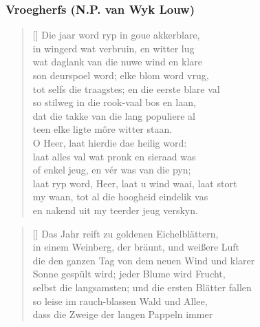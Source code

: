 \documentclass[8pt]{beamer}
\begin{document}
\begin{frame}
	\frametitle{Vroegherfs (N.P. van Wyk Louw)}
	\begin{center}
		\settowidth{\versewidth}{laat ryp word, Heer, laat u wind waai,
		laat stort }
		\begin{minipage}[t]{\dimexpr\versewidth+1sp\relax}
			\begin{verse}[\versewidth]
				Die jaar word ryp in goue akkerblare, \\
				in wingerd wat verbruin, en witter lug \\
				wat daglank van die nuwe wind en klare \\
				son deurspoel word; elke blom word vrug, \\
				tot selfs die traagstes; en die eerste blare val
				\\
				so stilweg in die rook-vaal bos en laan, \\
				dat die takke van die lang populiere al \\
				teen elke ligte m{\^o}re witter staan. \\
				O Heer, laat hierdie dae heilig word: \\
				laat alles val wat pronk en sieraad was \\
				of enkel jeug, en v{\'e}r was van die pyn; \\
				laat ryp word, Heer, laat u wind waai, laat
				stort \\
				my waan, tot al die hoogheid eindelik vas \\
				en nakend uit my teerder jeug verskyn.
			\end{verse}
		\end{minipage}\hfill
		\settowidth{\versewidth}{laat ryp word, Heer, laat u wind waai,
		laat stort}
		\begin{minipage}[t]{\dimexpr\versewidth+1sp\relax}
			\begin{verse}[\versewidth]
				Das Jahr reift zu goldenen Eichelbl{\"a}ttern,
				\\
				in einem Weinberg, der br{\"a}unt, und
				wei{\ss}ere Luft \\
				die den ganzen Tag von dem neuen Wind und klarer
				\\
				Sonne gesp{\"u}lt wird; jeder Blume wird Frucht,
				\\
				selbst die langsamsten; und die ersten
				Bl{\"a}tter fallen \\
				so leise im rauch-blassen Wald und Allee, \\
				dass die Zweige der langen Pappeln immer \\

\end{verse}
\end{minipage}
\end{center}
\end{frame}
\end{document}
